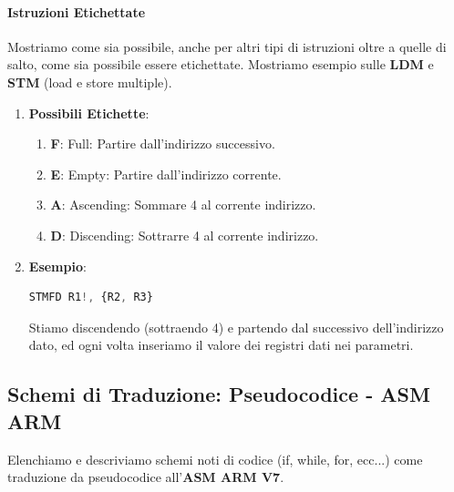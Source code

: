 \documentclass{article}
\begin{document}
\paragraph{Istruzioni Etichettate} Mostriamo come sia possibile, anche per altri tipi di istruzioni oltre a quelle di salto, come sia possibile essere etichettate. Mostriamo esempio sulle \textbf{LDM} e \textbf{STM} (load e store multiple).

\begin{enumerate}
    \item \textbf{Possibili Etichette}:
    \begin{enumerate}
        \item \textbf{F}: Full: Partire dall'indirizzo successivo.
        \item \textbf{E}: Empty: Partire dall'indirizzo corrente.
        \item \textbf{A}: Ascending: Sommare 4 al corrente indirizzo.
        \item \textbf{D}: Discending: Sottrarre 4 al corrente indirizzo. 
    \end{enumerate}
    \item \textbf{Esempio}:
\begin{lstlisting}[language = JavaScript]
    STMFD R1!, {R2, R3}
\end{lstlisting}
\vspace*{-20px}

Stiamo discendendo (sottraendo 4) e partendo dal successivo dell'indirizzo dato, ed ogni volta inseriamo il valore dei registri dati nei parametri.

\end{enumerate}

\newpage

\subsection{Schemi di Traduzione: Pseudocodice - ASM ARM}

Elenchiamo e descriviamo schemi noti di codice (if, while, for, ecc...) come traduzione da pseudocodice all'\textbf{ASM ARM V7}.
\end{document}
